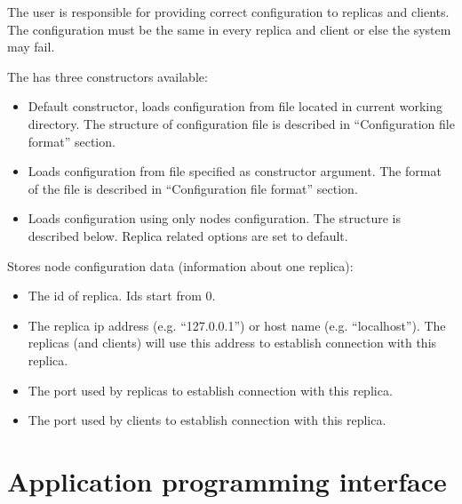 The user is responsible for providing correct configuration to replicas and
clients. The configuration must be the same in every replica and client or else
the system may fail.


\label{config:jpaxos-configclass}\label{config:configuration-class}
The  has three constructors available:
\begin{itemize}
\item {} 
Default constructor, loads configuration from  file
located in current working directory. The structure of configuration file is
described in ``Configuration file format'' section.

\item {} 
Loads configuration from file specified as constructor argument. The format
of the file is described in ``Configuration file format'' section.

\item {} 
Loads configuration using only no\-des configuration. The  structure is
described below. Replica related options are set to default.

\end{itemize}


\label{config:pid-class}
Stores node configuration data (information about one replica):
\begin{itemize}
\item {} 
The id of replica. Ids start from 0.

\item {} 
The replica ip address (e.g. ``127.0.0.1'') or host name (e.g. ``localhost'').
The replicas (and clients) will use this address to establish connection with
this replica.

\item {} 
The port used by replicas to establish connection with this replica.

\item {} 
The port used by clients to establish connection with this replica.

\end{itemize}


\section{Application programming interface}
\label{api:application-programming-interface}\label{api:jpaxos-api}\label{api:code-generation-library}\label{api::doc}

